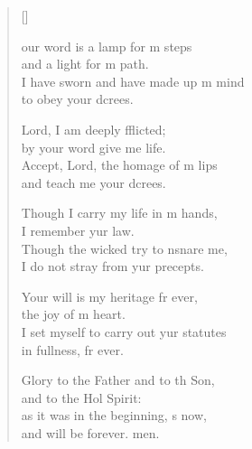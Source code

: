 \settowidth{\versewidth}{I set myself to carry out your statutes *}
\begin{verse}[\versewidth]
  \begin{patverse}
our word is a lamp for m steps\Med\\
and a light for m path.\\
I have sworn and have made up m mind\Med\\
to obey your dcrees.

Lord, I am deeply fflicted;\Med\\
by your word give me life.\\
Accept, Lord, the homage of m lips\Med\\
and teach me your dcrees.

Though I carry my life in m hands,\Med\\
I remember yur law.\\
Though the wicked try to nsnare me,\Med\\
I do not stray from yur precepts.

Your will is my heritage fr ever,\Med\\
the joy of m heart.\\
I set myself to carry out yur statutes\Med\\
in fullness, fr ever.

Glory to the Father and to th Son,\Med\\
and to the Hol Spirit:\\
as it was in the beginning, \pointup{\i}s now,\Med\\
and will be forever. men. 
  \end{patverse}
\end{verse}
